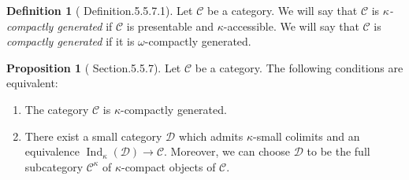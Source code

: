 \documentclass[a4paper,dvipdfmx,11pt,reqno]{amsart}
\DeclareMathOperator{\Ind}{Ind}
\newcommand{\C}{\mathcal{C}}
\newcommand{\D}{\mathcal{D}}
\theoremstyle{definition}
\newtheorem{definition}[theorem]{Definition}
\newtheorem{lemma}[theorem]{Lemma}
\newtheorem{proposition}[theorem]{Proposition}
\newtheorem{remark}[theorem]{Remark}
\begin{document}
\begin{definition}[\cite{HTT} Definition.5.5.7.1]
  Let $\C$ be a category.
  We will say that $\C$ is \textit{$\kappa$-compactly generated} if $\C$ is presentable and $\kappa$-accessible.
  We will say that $\C$ is \textit{compactly generated} if it is $\omega$-compactly generated.
\end{definition}

\begin{proposition}[\cite{HTT} Section.5.5.7]
  Let $\C$ be a category.
  The following conditions are equivalent:
  \begin{enumerate}
    \item The category $\C$ is $\kappa$-compactly generated.
    \item There exist a small category $\D$ which admits $\kappa$-small colimits and an equivalence $\Ind_{\kappa}(\D) \to \C$. 
    Moreover, we can choose $\D$ to be the full subcategory $\C^{\kappa}$ of $\kappa$-compact objects of $\C$.
  \end{enumerate}
\end{proposition}
 


\end{document}
